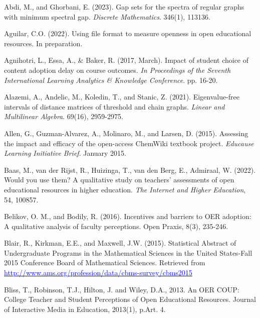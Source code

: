 \documentclass[11pt]{article}
\newcommand{\alink}[2]{\href{#1}{\textcolor{blue}{#2}}}
\begin{document}
\newpage

\begin{thebibliography}{99}

   Abdi, M., and Ghorbani, E. (2023). Gap sets for the spectra of regular graphs with minimum spectral gap. {\em Discrete Mathematics}. 346(1), 113136.

   Aguilar, C.O. (2022). Using file format to measure openness in open educational resources. In preparation.

   Agnihotri, L., Essa, A., \& Baker, R. (2017, March). Impact of student choice of content adoption delay on course outcomes. {\em In Proceedings of the Seventh International Learning Analytics \& Knowledge Conference}. pp. 16-20.

   Alazemi, A., Andelic, M., Koledin, T., and Stanic, Z. (2021). Eigenvalue-free intervals of distance matrices of threshold and chain graphs. {\em Linear and Multilinear Algebra}. 69(16), 2959-2975.

   Allen, G., Guzman-Alvarez, A., Molinaro, M., and Larsen, D. (2015). Assessing the impact and efficacy of the open-access ChemWiki textbook project. {\em Educause Learning Initiative Brief}. January 2015.

   Baas, M., van der Rijst, R., Huizinga, T., van den Berg, E., Admiraal, W. (2022). Would you use them? A qualitative study on teachers' assessments of open educational resources in higher education. {\em The Internet and Higher Education}, 54, 100857.

   Belikov, O. M., and Bodily, R. (2016). Incentives and barriers to OER adoption: A qualitative analysis of faculty perceptions. Open Praxis, 8(3), 235-246. %

   Blair, R., Kirkman, E.E., and Maxwell, J.W. (2015). Statistical Abstract of Undergraduate Programs in the Mathematical Sciences in the United States-Fall 2015 Conference Board of Mathematical Sciences.  Retrieved from \alink{http://www.ams.org/profession/data/cbms-survey/cbms2015}{http://www.ams.org/profession/data/cbms-survey/cbms2015}
  
   Bliss, T., Robinson, T.J., Hilton, J. and Wiley, D.A., 2013. An OER COUP: College Teacher and Student Perceptions of Open Educational Resources. Journal of Interactive Media in Education, 2013(1), p.Art. 4.%


\end{thebibliography}
\end{document}
